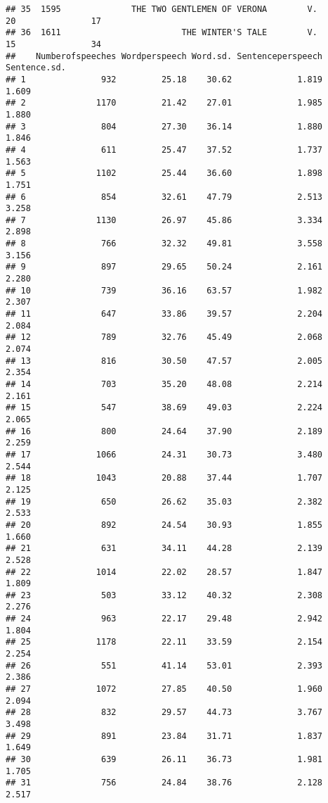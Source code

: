 \documentclass{article}\usepackage[]{graphicx}\usepackage[]{color}
\makeatletter
\newenvironment{kframe}{%
 \def\at@end@of@kframe{}%
 \ifinner\ifhmode%
  \def\at@end@of@kframe{\end{minipage}}%
  \begin{minipage}{\columnwidth}%
 \fi\fi%
 \def\FrameCommand##1{\hskip\@totalleftmargin \hskip-\fboxsep
 \colorbox{shadecolor}{##1}\hskip-\fboxsep
     \hskip-\linewidth \hskip-\@totalleftmargin \hskip\columnwidth}%
 \MakeFramed {\advance\hsize-\width
   \@totalleftmargin\z@ \linewidth\hsize
   \@setminipage}}%
 {\par\unskip\endMakeFramed%
 \at@end@of@kframe}
\newenvironment{knitrout}{}{} %
\makeatother
\begin{document}
\begin{knitrout}
\begin{kframe}
\begin{verbatim}
## 35  1595              THE TWO GENTLEMEN OF VERONA        V.          20               17
## 36  1611                        THE WINTER'S TALE        V.          15               34
##    Numberofspeeches Wordperspeech Word.sd. Sentenceperspeech Sentence.sd.
## 1               932         25.18    30.62             1.819        1.609
## 2              1170         21.42    27.01             1.985        1.880
## 3               804         27.30    36.14             1.880        1.846
## 4               611         25.47    37.52             1.737        1.563
## 5              1102         25.44    36.60             1.898        1.751
## 6               854         32.61    47.79             2.513        3.258
## 7              1130         26.97    45.86             3.334        2.898
## 8               766         32.32    49.81             3.558        3.156
## 9               897         29.65    50.24             2.161        2.280
## 10              739         36.16    63.57             1.982        2.307
## 11              647         33.86    39.57             2.204        2.084
## 12              789         32.76    45.49             2.068        2.074
## 13              816         30.50    47.57             2.005        2.354
## 14              703         35.20    48.08             2.214        2.161
## 15              547         38.69    49.03             2.224        2.065
## 16              800         24.64    37.90             2.189        2.259
## 17             1066         24.31    30.73             3.480        2.544
## 18             1043         20.88    37.44             1.707        2.125
## 19              650         26.62    35.03             2.382        2.533
## 20              892         24.54    30.93             1.855        1.660
## 21              631         34.11    44.28             2.139        2.528
## 22             1014         22.02    28.57             1.847        1.809
## 23              503         33.12    40.32             2.308        2.276
## 24              963         22.17    29.48             2.942        1.804
## 25             1178         22.11    33.59             2.154        2.254
## 26              551         41.14    53.01             2.393        2.386
## 27             1072         27.85    40.50             1.960        2.094
## 28              832         29.57    44.73             3.767        3.498
## 29              891         23.84    31.71             1.837        1.649
## 30              639         26.11    36.73             1.981        1.705
## 31              756         24.84    38.76             2.128        2.517

\end{verbatim}
\end{kframe}
\end{knitrout}
\end{document}
